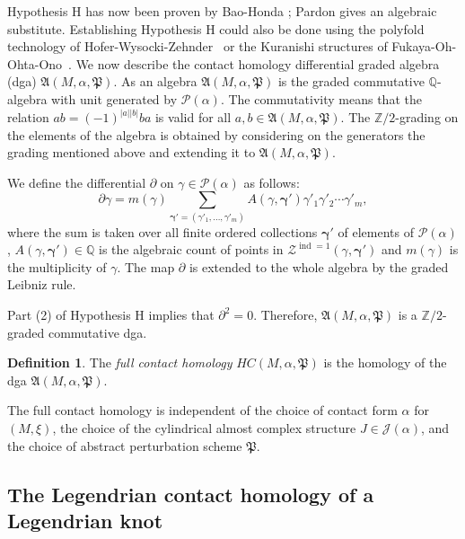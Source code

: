 \documentclass[10pt]{amsart}
\let\mathcal\mathscr
\theoremstyle{plain}
\theoremstyle{definition}
\newtheorem{defn}[thm]{Definition}
\numberwithin{equation}{subsection}
\newcommand{\QQ}{\mathbb{Q}}
\newcommand{\bdry}{\partial}
\let\op\operatorname
\let\bs\boldsymbol
\begin{document}
Hypothesis H has now been proven by Bao-Honda \cite{BH}; Pardon \cite{Pa1,Pa2} gives an algebraic substitute. Establishing Hypothesis H could also be done using the polyfold technology of Hofer-Wysocki-Zehnder~\cite{HWZ2} or the Kuranishi structures of Fukaya-Oh-Ohta-Ono~\cite{FO3}. We now describe the contact homology differential graded algebra (dga) $\mathfrak{A}(M,\alpha, {\mathfrak P})$. As an algebra $\mathfrak{A}(M,\alpha, {\mathfrak P})$ is the graded commutative $\mathbb{Q}$-algebra with unit generated by $\mathcal{P}(\alpha)$. The commutativity means that the relation $a b = (-1)^{|a||b|}ba$ is valid for all $a,b \in \mathfrak{A}(M,\alpha,{\mathfrak P})$. The $\mathbb{Z}/2$-grading on the elements of the algebra is obtained by considering on the generators the grading mentioned above and extending it to $\mathfrak{A}(M,\alpha, {\mathfrak P})$.

We define the differential $\bdry$ on $\gamma\in \mathcal{P}(\alpha)$ as follows:
\begin{equation}
\bdry \gamma = m(\gamma) \sum_{\bs{\gamma}'=(\gamma'_1,\dots,\gamma'_m)} A(\gamma,\bs\gamma') \gamma'_1 \gamma'_2\cdots \gamma'_m,
\end{equation}
where the sum is taken over all finite ordered collections $\bs\gamma'$ of elements of $\mathcal{P}(\alpha)$, $A(\gamma,\bs\gamma')\in \QQ$ is the algebraic count of points in $\mathcal{Z}^{\op{ind}=1}(\gamma,\bs\gamma')$ and $m(\gamma)$ is the multiplicity of $\gamma$. The map $\bdry$ is extended to the whole algebra by the graded Leibniz rule.

Part (2) of Hypothesis H implies that $\bdry^2=0$. Therefore, $\mathfrak{A}(M,\alpha,{\mathfrak P})$ is a $\mathbb{Z}/2$-gra\-ded commutative dga.

\begin{defn}
The {\em full contact homology} $HC(M,\alpha,{\mathfrak P})$ is the homology of the dga $\mathfrak{A}(M,\alpha,{\mathfrak P})$.
\end{defn}

The full contact homology is independent of the choice of contact form $\alpha$ for $(M,\xi)$, the choice of the cylindrical almost complex structure $J\in \mathcal{J}(\alpha)$, and the choice of abstract perturbation scheme ${\mathfrak P}$.

\subsection{The Legendrian contact homology of a Legendrian knot}
\end{document}
